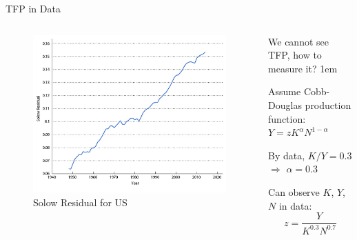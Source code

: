\documentclass[11pt,aspectratio=43]{beamer}
\let\olditemize=\itemize
\let\endolditemize=\enditemize
\renewenvironment{itemize}{\olditemize \itemsep1em}{\endolditemize}
\theoremstyle{definition}
\begin{document}
\begin{frame}{TFP in Data}
\label{slide:TFP_in_Data}
    \begin{columns}
        \begin{column}{0.6\textwidth}
            \begin{figure}
                \caption{\alert{Solow Residual} for US}
                \includegraphics[width=\textwidth]{./figures/Figure4_18.jpg}
            \end{figure}
        \end{column}
        \begin{column}{0.4\textwidth}
            We cannot see TFP, \alert{how to measure it}?
            \begin{itemize}
                \item Assume Cobb-Douglas production function: $ Y = z K^{\alpha} N^{1-\alpha} $
                \item By data, $ K/Y = 0.3 $ $ \Rightarrow  $ $ \alpha = 0.3  $
                \item Can observe $ K $, $ Y $, $ N $ in data:
                \begin{equation*}
                   z = \frac{Y}{K^{0.3}N^{0.7}}
                \end{equation*}
            \end{itemize}
        \end{column}
    \end{columns}
\end{frame}
\end{document}
